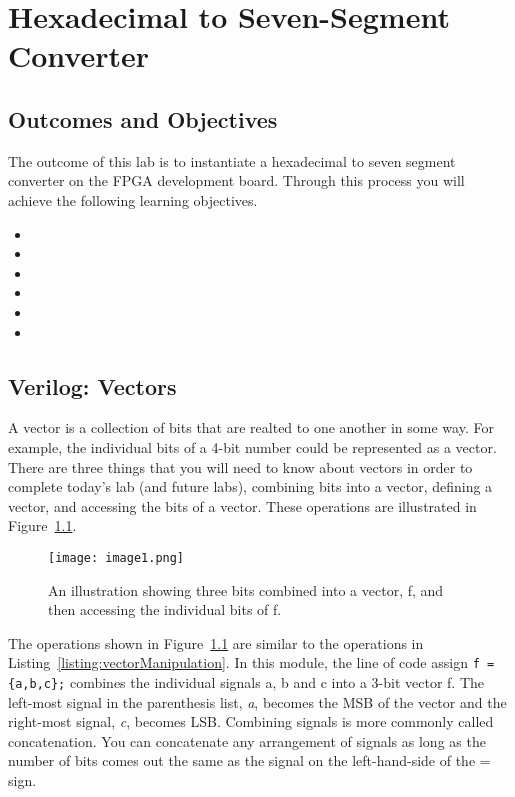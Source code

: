 \chapter{Hexadecimal to Seven-Segment Converter}
\label{chapter:HexToSeven}
\graphicspath{ {./Lab02HexToSeven/Fig} }

\section{Outcomes and Objectives}

The outcome of this lab is to instantiate a hexadecimal to seven segment converter
on the FPGA development board.  Through this process you will achieve the following
learning objectives.
\begin{itemize}
	\itemsep=0em
	\item {}
	\item {}
	\item {}
	\item {}	
	\item {}
	\item {}
\end{itemize}


\section{Verilog: Vectors}

A vector is a collection of bits that are realted to one another in some way.  For example,
the individual bits of a 4-bit number could be represented as a vector.
There are three things that you will need to know about vectors in order to
complete today's lab (and future labs), combining bits into a vector,
defining a vector, and accessing the bits of a vector. These operations
are illustrated in Figure~\ref{fig:combinVector}.

\begin{figure}[ht]
\texttt{[image: image1.png]}
\caption{An illustration showing three bits combined into a vector, f, 
and then accessing the individual bits of f.}
\label{fig:combinVector}
\end{figure}

The operations shown in Figure~\ref{fig:combinVector} are similar to
the operations in Listing~\ref{listing:vectorManipulation}. 
In this module, the line of code assign \verb+f = {a,b,c};+ combines the
individual signals a, b and c into a 3-bit vector f. The left-most signal
in the parenthesis list, \emph{a}, becomes the MSB of the vector and the 
right-most signal, \emph{c}, becomes LSB. 
Combining signals is more commonly called concatenation. You can
concatenate any arrangement of signals as long as the number of bits
comes out the same as the signal on the left-hand-side of the = sign.

